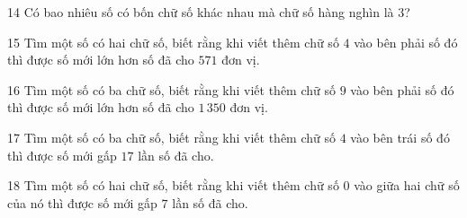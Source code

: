 \gap
\begin{probbox}{14}{\relax}
Có bao nhiêu số có bốn chữ số khác nhau mà chữ số hàng nghìn là $3$?
\end{probbox}
\gap
\begin{probbox}{15}{\relax}
Tìm một số có hai chữ số, biết rằng khi viết thêm chữ số $4$ vào bên phải số đó thì được số mới lớn hơn số đã cho $571$ đơn vị.
\end{probbox}
\gap
\begin{probbox}{16}{\relax}
Tìm một số có ba chữ số, biết rằng khi viết thêm chữ số $9$ vào bên phải số đó thì được số mới lớn hơn số đã cho $1\,350$ đơn vị.
\end{probbox}
\gap
\begin{probbox}{17}{\relax}
Tìm một số có ba chữ số, biết rằng khi viết thêm chữ số $4$ vào bên trái số đó thì được số mới gấp $17$ lần số đã cho.
\end{probbox}
\gap
\begin{probbox}{18}{\relax}
Tìm một số có hai chữ số, biết rằng khi viết thêm chữ số $0$ vào giữa hai chữ số của nó thì được số mới gấp $7$ lần số đã cho.
\end{probbox}
